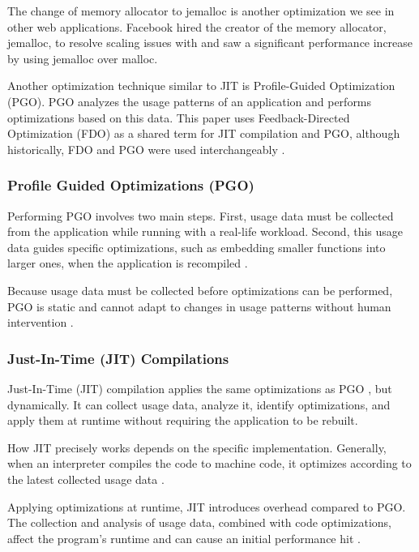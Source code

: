 \documentclass[main.tex]{subfiles}
\begin{document}
The change of memory allocator to jemalloc is another optimization we see in other web applications. Facebook hired the creator of the memory allocator, jemalloc, to resolve scaling issues with \cite{facebook-jemalloc} and saw a significant performance increase by using jemalloc over malloc.

Another optimization technique similar to JIT is Profile-Guided Optimization (PGO). PGO analyzes the usage patterns of an application and performs optimizations based on this data. This paper uses Feedback-Directed Optimization (FDO) as a shared term for JIT compilation and PGO, although historically, FDO and PGO were used interchangeably \cite{Wicht_Vitillo_Chen_Levinthal_2014}.

\subsubsection{Profile Guided Optimizations (PGO)}

Performing PGO involves two main steps. First, usage data must be collected from the application while running with a real-life workload. Second, this usage data guides specific optimizations, such as embedding smaller functions into larger ones, when the application is recompiled \cite{Wade_Kulkarni_Jantz_2017}.

Because usage data must be collected before optimizations can be performed, PGO is static and cannot adapt to changes in usage patterns without human intervention \cite{Wade_Kulkarni_Jantz_2017}. 

\subsubsection{Just-In-Time (JIT) Compilations}

Just-In-Time (JIT) compilation applies the same optimizations as PGO \cite{Wade_Kulkarni_Jantz_2017}, but dynamically. It can collect usage data, analyze it, identify optimizations, and apply them at runtime without requiring the application to be rebuilt.

How JIT precisely works depends on the specific implementation. Generally, when an interpreter compiles the code to machine code, it optimizes according to the latest collected usage data \cite{Wade_Kulkarni_Jantz_2017}. 

Applying optimizations at runtime, JIT introduces overhead compared to PGO. The collection and analysis of usage data, combined with code optimizations, affect the program's runtime and can cause an initial performance hit \cite{Aycock_2003}.
\end{document}
